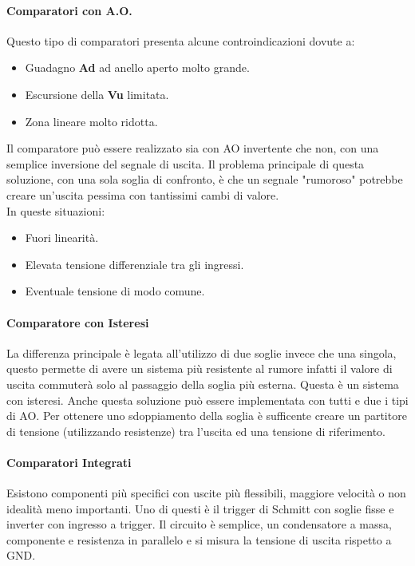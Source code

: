 \documentclass[12pt]{article}
\begin{document}
\paragraph{Comparatori con A.O.} Questo tipo di comparatori presenta alcune controindicazioni dovute a:
\begin{itemize}
  \item Guadagno \textbf{Ad} ad anello aperto molto grande.
  \item Escursione della \textbf{Vu} limitata.
  \item Zona lineare molto ridotta.
\end{itemize}
Il comparatore può essere realizzato sia con AO invertente che non, con una semplice inversione del segnale di uscita. Il problema principale di questa soluzione, con una sola soglia di confronto, è che un segnale "rumoroso" potrebbe creare un'uscita pessima con tantissimi cambi di valore.\\
In queste situazioni:
\begin{itemize}
  \item Fuori linearità.
  \item Elevata tensione differenziale tra gli ingressi.
  \item Eventuale tensione di modo comune.
\end{itemize}

\paragraph{Comparatore con Isteresi} La differenza principale è legata all'utilizzo di due soglie invece che una singola, questo permette di avere un sistema più resistente al rumore infatti il valore di uscita commuterà solo al passaggio della soglia più esterna. Questa è un sistema con isteresi. Anche questa soluzione può essere implementata con tutti e due i tipi di AO. Per ottenere uno sdoppiamento della soglia è sufficente creare un partitore di tensione (utilizzando resistenze) tra l'uscita ed una tensione di riferimento.

\paragraph{Comparatori Integrati} Esistono componenti più specifici con uscite più flessibili, maggiore velocità o non idealità meno importanti. Uno di questi è il trigger di Schmitt con soglie fisse e inverter con ingresso a trigger. Il circuito è semplice, un condensatore a massa, componente e resistenza in parallelo e si misura la tensione di uscita rispetto a GND.
\end{document}
